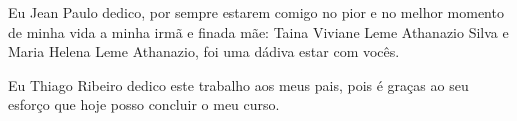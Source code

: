 \begin{midpage}

Eu Jean Paulo dedico, por sempre estarem comigo no pior e no melhor momento de minha vida a minha irmã e finada mãe: Taina Viviane Leme Athanazio Silva e Maria Helena Leme Athanazio, foi uma dádiva estar com vocês. 

Eu Thiago Ribeiro dedico este trabalho aos meus pais, pois é graças ao seu esforço que hoje posso concluir o meu curso. 
\end{midpage}

